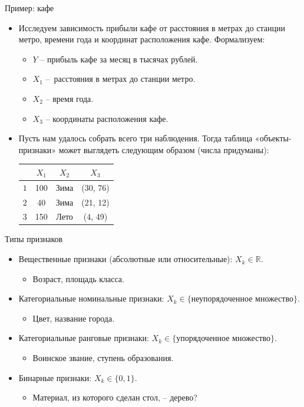 \documentclass[c, handout]{beamer} %
\def \R{\mathbb{R}}
\begin{document}
	\begin{frame}{Пример: кафе}
		\begin{itemize}
			\item<1-> Исследуем зависимость прибыли кафе от расстояния в метрах до станции метро, времени года и координат расположения кафе. Формализуем:
			\begin{itemize}
				\item $Y$ – прибыль кафе за месяц в тысячах рублей.
				\item $X_1$ – расстояния в метрах до станции метро.
				\item $X_2$ – время года.
				\item $X_3$ – координаты расположения кафе.
			\end{itemize}
			\item<2-> Пусть нам удалось собрать всего три наблюдения. Тогда таблица «объекты-признаки» может выглядеть следующим образом (числа придуманы):
			\begin{center}
				\def\arraystretch{1.5}
				\begin{tabular}{l| c c c}
					\hline
					& $X_1$ & $X_2$ & $X_3$ \\
					\hline
					$1$ & 100 & Зима & (30, 76) \\
					$2$ & 40   & Зима & (21, 12) \\
					$3$ & 150 & Лето & (4, 49) \\
				\end{tabular}
			\end{center}
		\end{itemize}
	\end{frame}

	\begin{frame}{Типы признаков}
		\begin{itemize}\setlength\itemsep{1em}
			\item<1-> Вещественные признаки (абсолютные или относительные): $X_k \in \R$.
				\begin{itemize}
					\item Возраст, площадь класса.
				\end{itemize}
			\item<2-> Категориальные номинальные признаки: $X_k \in \{\text{неупорядоченное множество}\}$.
			\begin{itemize}
				\item Цвет, название города.
			\end{itemize}
			\item<3-> Категориальные ранговые признаки: $X_k \in \{\text{упорядоченное множество}\}$.
			\begin{itemize}
				\item Воинское звание, ступень образования.
			\end{itemize}
		\item<4-> Бинарные признаки: $X_k \in \{0, 1\}$.
		\begin{itemize}
			\item Материал, из которого сделан стол, – дерево? 
		\end{itemize}
		\end{itemize}
	\end{frame}
\end{document}
